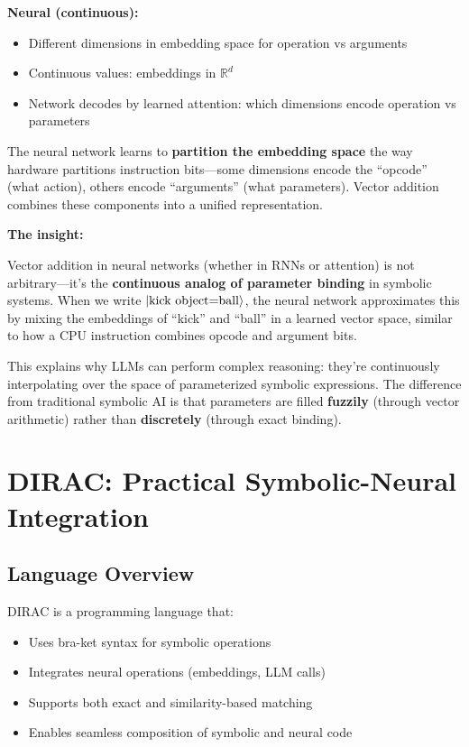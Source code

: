 \documentclass[11pt,a4paper]{article}
\theoremstyle{definition}
\begin{document}
\textbf{Neural (continuous):}
\begin{itemize}
\item Different dimensions in embedding space for operation vs arguments
\item Continuous values: embeddings in $\mathbb{R}^d$
\item Network decodes by learned attention: which dimensions encode operation vs parameters
\end{itemize}

The neural network learns to \textbf{partition the embedding space} the way hardware partitions instruction bits---some dimensions encode the ``opcode'' (what action), others encode ``arguments'' (what parameters). Vector addition combines these components into a unified representation.

\textbf{The insight:}

Vector addition in neural networks (whether in RNNs or attention) is not arbitrary---it's the \textbf{continuous analog of parameter binding} in symbolic systems. When we write $\ket{\text{kick object=ball}}$, the neural network approximates this by mixing the embeddings of ``kick'' and ``ball'' in a learned vector space, similar to how a CPU instruction combines opcode and argument bits.

This explains why LLMs can perform complex reasoning: they're continuously interpolating over the space of parameterized symbolic expressions. The difference from traditional symbolic AI is that parameters are filled \textbf{fuzzily} (through vector arithmetic) rather than \textbf{discretely} (through exact binding).

\section{DIRAC: Practical Symbolic-Neural Integration}

\subsection{Language Overview}

DIRAC is a programming language that:
\begin{itemize}
\item Uses bra-ket syntax for symbolic operations
\item Integrates neural operations (embeddings, LLM calls)
\item Supports both exact and similarity-based matching
\item Enables seamless composition of symbolic and neural code
\end{itemize}
\end{document}
